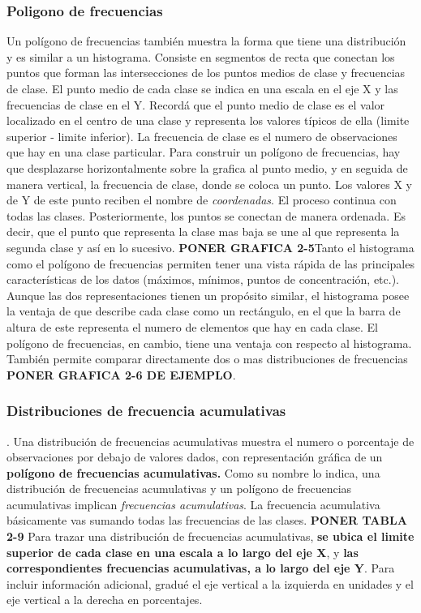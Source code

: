 \documentclass[]{article}
\begin{document}
\subsubsection*{Poligono de frecuencias}
Un polígono de frecuencias también muestra la forma que tiene una distribución y es similar a un histograma. Consiste en segmentos de recta que conectan los puntos que forman las intersecciones de los puntos medios de clase y frecuencias de clase. El punto medio de cada clase se indica en una escala en el eje X y las frecuencias de clase en el Y. Recordá que el punto medio de clase es el valor localizado en el centro de una clase y representa los valores típicos de ella (limite superior - limite inferior). La frecuencia de clase es el numero de observaciones que hay en una clase particular. Para construir un polígono de frecuencias, hay que desplazarse horizontalmente sobre la grafica al punto medio, y en seguida de manera vertical, la frecuencia de clase, donde se coloca un punto. Los valores X y de Y de este punto reciben el nombre de \textit{coordenadas}. El proceso continua con todas las clases. Posteriormente, los puntos se conectan de manera ordenada. Es decir, que el punto que representa la clase mas baja se une al que representa la segunda clase y así en lo sucesivo. \textbf{PONER GRAFICA 2-5}\linebreak Tanto el histograma como el polígono de frecuencias permiten tener una vista rápida de las principales características de los datos (máximos, mínimos, puntos de concentración, etc.). Aunque las dos representaciones tienen un propósito similar, el histograma posee la ventaja de que describe cada clase como un rectángulo, en el que la barra de altura de este representa el numero de elementos que hay en cada clase. El polígono de frecuencias, en cambio, tiene una ventaja con respecto al histograma. También permite comparar directamente dos o mas distribuciones de frecuencias \textbf{PONER GRAFICA 2-6 DE EJEMPLO}.
\subsubsection*{Distribuciones de frecuencia acumulativas}.
Una distribución de frecuencias acumulativas muestra el numero o porcentaje de observaciones por debajo de valores dados, con representación gráfica de un \textbf{polígono de frecuencias acumulativas.} Como su nombre lo indica, una distribución de frecuencias acumulativas y un polígono de frecuencias acumulativas implican \textit{frecuencias acumulativas}. La frecuencia acumulativa básicamente vas sumando todas las frecuencias de las clases. \textbf{PONER TABLA 2-9}
Para trazar una distribución de frecuencias acumulativas, \textbf{se ubica el limite superior de cada clase en una escala a lo largo del eje X}, y \textbf{las correspondientes frecuencias acumulativas, a lo largo del eje Y}. Para incluir información adicional, gradué el eje vertical a la izquierda en unidades y el eje vertical a la derecha en porcentajes.
\end{document}

